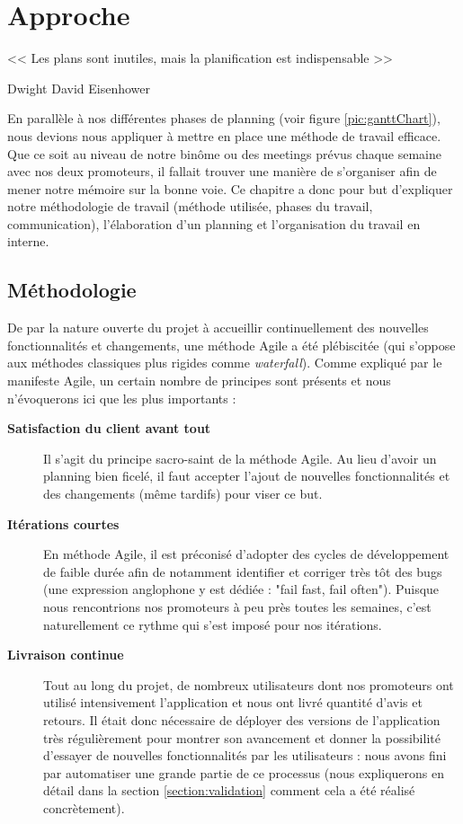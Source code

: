 \chapter{Approche}

\epigraph{<< Les plans sont inutiles, mais la planification est indispensable >>}{Dwight David Eisenhower}

En parallèle à nos différentes phases de planning (voir figure \ref{pic:ganttChart}), nous devions nous appliquer à mettre en place une méthode de travail efficace. Que ce soit au niveau de notre binôme ou des meetings prévus chaque semaine avec nos deux promoteurs, il fallait trouver une manière de s'organiser afin de mener notre mémoire sur la bonne voie. Ce chapitre a donc pour but d'expliquer notre méthodologie de travail (méthode utilisée, phases du travail, communication), l'élaboration d'un planning et l'organisation du travail en interne.

\section{Méthodologie}
\label{section:methodologie}

De par la nature ouverte du projet à accueillir continuellement des nouvelles fonctionnalités et changements, une méthode Agile a été plébiscitée (qui s'oppose aux méthodes classiques plus rigides comme \textit{waterfall}). Comme expliqué par le manifeste Agile\cite{agileManifeste}, un certain nombre de principes sont présents et nous n'évoquerons ici que les plus importants : 

\begin{description}
    \item[\textbf{Satisfaction du client avant tout}] Il s'agit du principe sacro-saint de la méthode Agile\cite{agileManifeste}. Au lieu d'avoir un planning bien ficelé, il faut accepter l'ajout de nouvelles fonctionnalités et des changements (même tardifs) pour viser ce but.
    
    \item[\textbf{Itérations courtes}] En méthode Agile\cite{agileManifeste}, il est préconisé d'adopter des cycles de développement de faible durée afin de notamment identifier et corriger très tôt des bugs (une expression anglophone y est dédiée : "fail fast, fail often"). Puisque nous rencontrions nos promoteurs à peu près toutes les semaines, c'est naturellement ce rythme qui s'est imposé pour nos itérations.
    
    \item[\textbf{Livraison continue}] Tout au long du projet, de nombreux utilisateurs dont nos promoteurs ont utilisé intensivement l'application et nous ont livré quantité d'avis et retours. Il était donc nécessaire de déployer des versions de l'application très régulièrement pour montrer son avancement et donner la possibilité d'essayer de nouvelles fonctionnalités par les utilisateurs : nous avons fini par automatiser une grande partie de ce processus (nous expliquerons en détail dans la section \ref{section:validation} comment cela a été réalisé concrètement).
\end{description}

